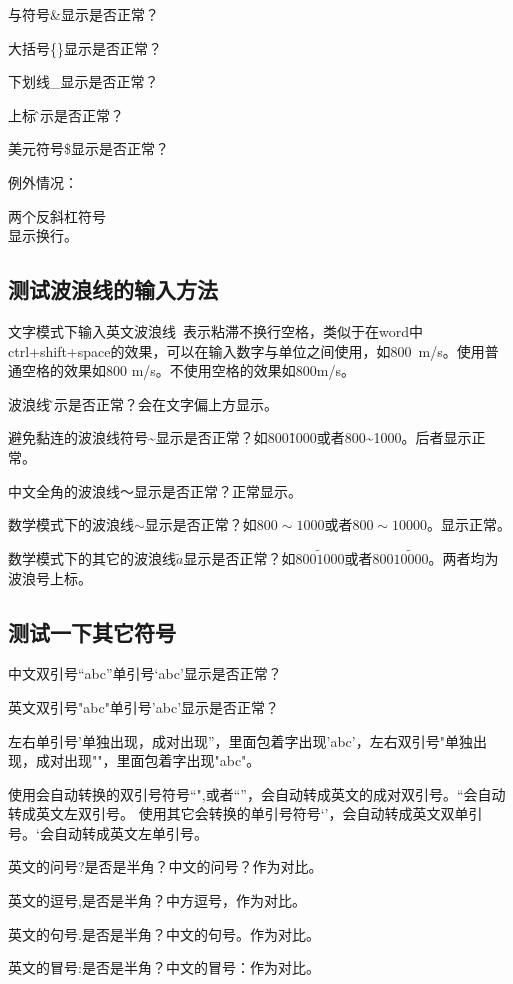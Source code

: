 与符号\&显示是否正常？

大括号\{\}显示是否正常？

下划线\_显示是否正常？

上标\^显示是否正常？

美元符号\$显示是否正常？

例外情况：

两个反斜杠符号\\显示换行。


\subsection{测试波浪线的输入方法}

文字模式下输入英文波浪线~表示粘滞不换行空格，类似于在word中ctrl+shift+space的效果，可以在输入数字与单位之间使用，如800~m/s。使用普通空格的效果如800 m/s。不使用空格的效果如800m/s。

波浪线\~显示是否正常？会在文字偏上方显示。

避免黏连的波浪线符号\~{}显示是否正常？如800\~{1000}或者800\~{}1000。后者显示正常。

中文全角的波浪线～显示是否正常？正常显示。

数学模式下的波浪线$\sim$显示是否正常？如$800\sim 1000$或者$800\sim{10000}$。显示正常。

数学模式下的其它的波浪线$\tilde{a}$显示是否正常？如$800\tilde 1000$或者$800\tilde{10000}$。两者均为波浪号上标。

\subsection{测试一下其它符号}

中文双引号“abc”单引号‘abc’显示是否正常？

英文双引号"abc"单引号'abc'显示是否正常？

左右单引号'单独出现，成对出现''，里面包着字出现'abc'，左右双引号"单独出现，成对出现""，里面包着字出现"abc"。

使用会自动转换的双引号符号``",或者``''，会自动转成英文的成对双引号。``会自动转成英文左双引号。
使用其它会转换的单引号符号`'，会自动转成英文双单引号。`会自动转成英文左单引号。

英文的问号?是否是半角？中文的问号？作为对比。

英文的逗号,是否是半角？中方逗号，作为对比。

英文的句号.是否是半角？中文的句号。作为对比。

英文的冒号:是否是半角？中文的冒号：作为对比。

